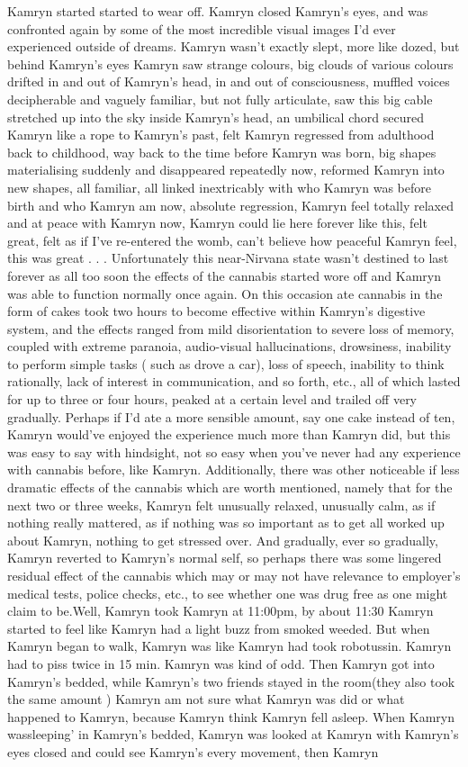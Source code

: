 \documentclass[12pt]{book}
\begin{document}
Kamryn started started to wear off. Kamryn closed Kamryn's eyes, and was confronted again by some of the most incredible visual images I'd ever experienced outside of dreams. Kamryn wasn't exactly slept, more like dozed, but behind Kamryn's eyes Kamryn saw strange colours, big clouds of various colours drifted in and out of Kamryn's head, in and out of consciousness, muffled voices decipherable and vaguely familiar, but not fully articulate, saw this big cable stretched up into the sky inside Kamryn's head, an umbilical chord secured Kamryn like a rope to Kamryn's past, felt Kamryn regressed from adulthood back to childhood, way back to the time before Kamryn was born, big shapes materialising suddenly and disappeared repeatedly now, reformed Kamryn into new shapes, all familiar, all linked inextricably with who Kamryn was before birth and who Kamryn am now, absolute regression, Kamryn feel totally relaxed and at peace with Kamryn now, Kamryn could lie here forever like this, felt great, felt as if I've re-entered the womb, can't believe how peaceful Kamryn feel, this was great . . .  Unfortunately this near-Nirvana state wasn't destined to last forever as all too soon the effects of the cannabis started wore off and Kamryn was able to function normally once again. On this occasion ate cannabis in the form of cakes took two hours to become effective within Kamryn's digestive system, and the effects ranged from mild disorientation to severe loss of memory, coupled with extreme paranoia, audio-visual hallucinations, drowsiness, inability to perform simple tasks ( such as drove a car), loss of speech, inability to think rationally, lack of interest in communication, and so forth, etc., all of which lasted for up to three or four hours, peaked at a certain level and trailed off very gradually. Perhaps if I'd ate a more sensible amount, say one cake instead of ten, Kamryn would've enjoyed the experience much more than Kamryn did, but this was easy to say with hindsight, not so easy when you've never had any experience with cannabis before, like Kamryn. Additionally, there was other noticeable if less dramatic effects of the cannabis which are worth mentioned, namely that for the next two or three weeks, Kamryn felt unusually relaxed, unusually calm, as if nothing really mattered, as if nothing was so important as to get all worked up about Kamryn, nothing to get stressed over. And gradually, ever so gradually, Kamryn reverted to Kamryn's normal self, so perhaps there was some lingered residual effect of the cannabis which may or may not have relevance to employer's medical tests, police checks, etc., to see whether one was drug free as one might claim to be.Well, Kamryn took Kamryn at 11:00pm, by about 11:30 Kamryn started to feel like Kamryn had a light buzz from smoked weeded. But when Kamryn began to walk, Kamryn was like Kamryn had took robotussin. Kamryn had to piss twice in 15 min. Kamryn was kind of odd. Then Kamryn got into Kamryn's bedded, while Kamryn's two friends stayed in the room(they also took the same amount ) Kamryn am not sure what Kamryn was did or what happened to Kamryn, because Kamryn think Kamryn fell asleep. When Kamryn wassleeping' in Kamryn's bedded, Kamryn was looked at Kamryn with Kamryn's eyes closed and could see Kamryn's every movement, then Kamryn 
\end{document}
